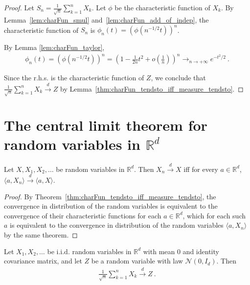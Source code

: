 \begin{proof}
\leanok
Let $S_n = \frac{1}{\sqrt{n}}\sum_{k=1}^n X_k$. Let $\phi$ be the characteristic function of $X_k$. By Lemma~\ref{lem:charFun_smul} and~\ref{lem:charFun_add_of_indep}, the characteristic function of $S_n$ is $\phi_n(t) = (\phi(n^{-1/2}t))^n$.

By Lemma \ref{lem:charFun_taylor},
\begin{align*}
\phi_n(t) = (\phi(n^{-1/2}t))^n = \left(1 - \frac{1}{2n}t^2 + o(\frac{1}{n})\right)^n \to_{n \to +\infty} e^{-t^2/2} \: .
\end{align*}

Since the r.h.s. is the characteristic function of $Z$, we conclude that $\frac{1}{\sqrt{n}}\sum_{k=1}^n X_k \xrightarrow{d} Z$ by Lemma~\ref{thm:charFun_tendsto_iff_measure_tendsto}.
\end{proof}


\section{The central limit theorem for random variables in $\mathbb{R}^d$}

\begin{theorem}\label{thm:cramer_wold}
Let $X, X_1, X_2, \ldots$ be random variables in $\mathbb{R}^d$.
Then $X_n \xrightarrow{d} X$ iff for every $a \in \mathbb{R}^d$, $\langle a, X_n \rangle \xrightarrow{d} \langle a, X \rangle$.
\end{theorem}

\begin{proof}
By Theorem~\ref{thm:charFun_tendsto_iff_measure_tendsto}, the convergence in distribution of the random variables is equivalent to the convergence of their characteristic functions for each $a \in \mathbb{R}^d$, which for each such $a$ is equivalent to the convergence in distribution of the random variables $\langle a, X_n \rangle$ by the same theorem.
\end{proof}

\begin{theorem}\label{thm:multivariate_clt}
Let $X_1, X_2, \ldots$ be i.i.d. random variables in $\mathbb{R}^d$ with mean 0 and identity covariance matrix, and let $Z$ be a random variable with law $\mathcal N(0,I_d)$. Then
\begin{align*}
\frac{1}{\sqrt{n}}\sum_{k=1}^n X_k \xrightarrow{d} Z \: .
\end{align*}
\end{theorem}

